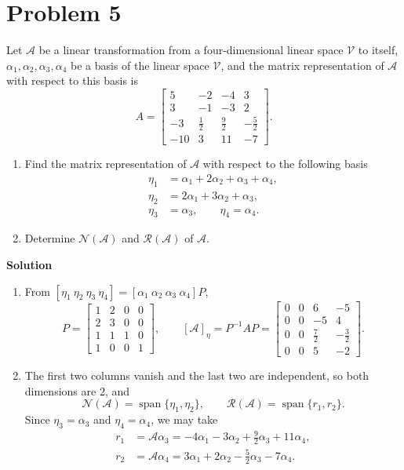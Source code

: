 \documentclass[UTF8,10pt,letterpaper,fontset=fandol]{ctexart}
\newcommand{\Span}{\operatorname{span}}
\newcommand{\Solution}{\par\Needspace{5\baselineskip}\textbf{Solution}\par}
\begin{document}
\section{Problem 5}
Let \(\mathcal A\) be a linear transformation from a four-dimensional linear space
\(\mathcal V\) to itself, \(\alpha_1,\alpha_2,\alpha_3,\alpha_4\) be a basis of
the linear space \(\mathcal V\), and the matrix representation of \(\mathcal A\)
with respect to this basis is
\[
A=\begin{bmatrix}
5&-2&-4&3\\3&-1&-3&2\\-3&\tfrac12&\tfrac92&-\tfrac52\\-10&3&11&-7
\end{bmatrix}.
\]
\begin{enumerate}
\item Find the matrix representation of \(\mathcal A\) with respect to the following basis
\[
\begin{aligned}
\eta_1&=\alpha_1+2\alpha_2+\alpha_3+\alpha_4,\\
\eta_2&=2\alpha_1+3\alpha_2+\alpha_3,\\
\eta_3&=\alpha_3,\qquad \eta_4=\alpha_4.
\end{aligned}
\]
\item Determine \(\mathcal N(\mathcal A)\) and \(\mathcal R(\mathcal A)\) of \(\mathcal A\).
\end{enumerate}

\Solution
\begin{enumerate}
\item From \([\eta_1\ \eta_2\ \eta_3\ \eta_4]=[\alpha_1\ \alpha_2\ \alpha_3\ \alpha_4]P\),
\[
P=\begin{bmatrix}1&2&0&0\\2&3&0&0\\1&1&1&0\\1&0&0&1\end{bmatrix},\qquad
\boxed{[\mathcal A]_{\eta}=P^{-1}AP=
\begin{bmatrix}0&0&6&-5\\0&0&-5&4\\0&0&\tfrac72&-\tfrac32\\0&0&5&-2\end{bmatrix}}.
\]
\item The first two columns vanish and the last two are independent, so both dimensions are \(2\), and
\[
\boxed{\mathcal N(\mathcal A)=\Span\{\eta_1,\eta_2\}},\qquad
\boxed{\mathcal R(\mathcal A)=\Span\{r_1,r_2\}}.
\]
Since \(\eta_3=\alpha_3\) and \(\eta_4=\alpha_4\), we may take
\[
\begin{aligned}
r_1&=\mathcal A\alpha_3=-4\alpha_1-3\alpha_2+\tfrac92\alpha_3+11\alpha_4,\\
r_2&=\mathcal A\alpha_4=3\alpha_1+2\alpha_2-\tfrac52\alpha_3-7\alpha_4.
\end{aligned}
\]
\end{enumerate}
\end{document}
